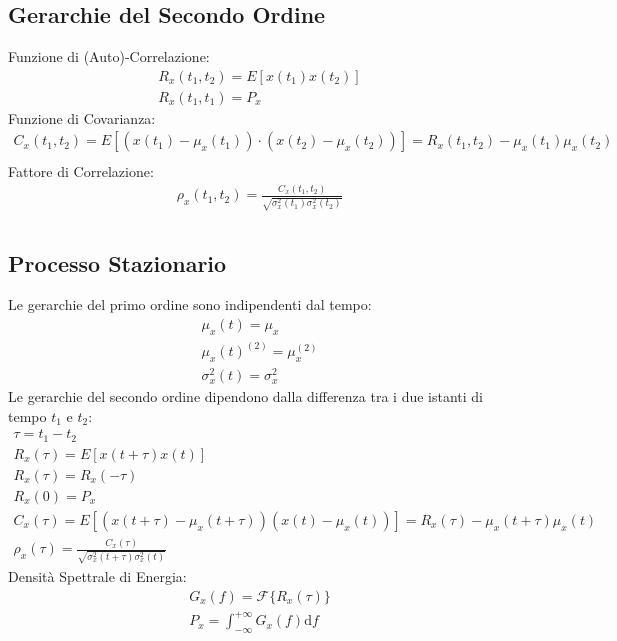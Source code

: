 \documentclass{article}
\newcommand{\df}{\mathrm{d}}
\newcommand{\intinf}{\displaystyle\int_{-\infty}^{+\infty}}
\begin{document}
\subsection*{Gerarchie del Secondo Ordine}
Funzione di (Auto)-Correlazione:
\begin{gather*}
    R_x(t_1,t_2)=E[x(t_1)x(t_2)]\\
    R_x(t_1,t_1)=P_x
\end{gather*}
Funzione di Covarianza:
\begin{gather*}
    C_x(t_1,t_2)=E[(x(t_1)-\mu_x(t_1))\cdot(x(t_2)-\mu_x(t_2))]=R_x(t_1,t_2)-\mu_{x}(t_1)\mu_{x}(t_2)\\
\end{gather*}
Fattore di Correlazione:
\begin{gather*}
    \rho_x(t_1,t_2)=\displaystyle\frac{C_x(t_1,t_2)}{\sqrt{\sigma_x^2(t_1)\sigma_x^2(t_2)}}\\
\end{gather*}
\subsection*{Processo Stazionario}
Le gerarchie del primo ordine sono indipendenti dal tempo: 
\begin{gather*}
    \mu_x(t)=\mu_x\\
    \mu_x(t)^{(2)}=\mu_x^{(2)}\\
    \sigma_x^2(t)=\sigma_x^2
\end{gather*}
Le gerarchie del secondo ordine dipendono dalla differenza tra i due istanti di tempo $t_1$ e $t_2$:
\begin{gather*}
    \tau=t_1-t_2\\
    R_x(\tau)=E[x(t+\tau)x(t)]\\
    R_x(\tau)=R_x(-\tau)\\
    R_x(0)=P_x\\
    C_x(\tau)=E[(x(t+\tau)-\mu_x(t+\tau))(x(t)-\mu_x(t))]=R_x(\tau)-\mu_x(t+\tau)\mu_x(t)\\
    \rho_x(\tau)=\displaystyle\frac{C_x(\tau)}{\sqrt{\sigma_x^2(t+\tau)\sigma_x^2(t)}}
\end{gather*}
Densità Spettrale di Energia:
\begin{gather*}
    G_x(f)=\mathscr{F}\{R_x(\tau)\}\\
    P_x=\intinf G_x(f)\df f
\end{gather*}
\end{document}
